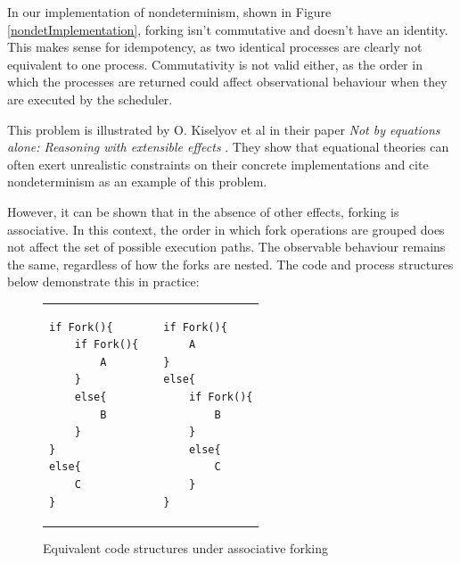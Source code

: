 \documentclass[logo,bsc,singlespacing,parskip]{infthesis}
\begin{document}
In our implementation of nondeterminism, shown in Figure  \ref{nondetImplementation}, forking isn't commutative and doesn't have an identity. This makes sense for idempotency, as two identical processes are clearly not equivalent to one process. Commutativity is not valid either, as the order in which the processes are returned could affect observational behaviour when they are executed by the scheduler.

This problem is illustrated by  O. Kiselyov et al in their paper \textit{Not by equations alone: Reasoning with extensible effects} \cite{kiselyov2021not}. They show that equational theories can often exert unrealistic constraints on their concrete implementations and cite nondeterminism as an example of this problem.


However, it can be shown that in the absence of other effects, forking is associative. In this context, the order in which fork operations are grouped does not affect the set of possible execution paths. The observable behaviour remains the same, regardless of how the forks are nested. The code and process structures below demonstrate this in practice:

\vspace{-2em}
\begin{figure}[H]
    \centering


\begin{table}[H]
\centering
\begin{tabular}{p{} c p{}}
\begin{lstlisting}
if Fork(){
    if Fork(){
        A
    }
    else{
        B
    }
}
else{
    C
}
\end{lstlisting}
&
&
\begin{lstlisting}
if Fork(){
    A
} 
else{
    if Fork(){
        B
    }
    else{
        C
    }
}
\end{lstlisting}
\end{tabular}
\end{table}
\vspace{-2em}

    \caption{Equivalent code structures under associative forking}
    \label{fig:code-structures}
\end{figure}
\end{document}
